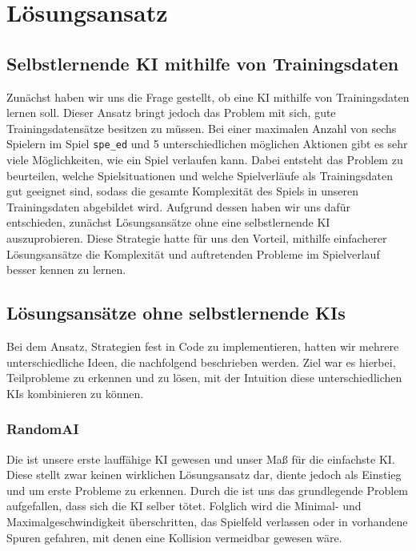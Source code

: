 \chapter{Lösungsansatz}
\label{ch:loesungsansatz}

\section{Selbstlernende KI mithilfe von Trainingsdaten}
\label{sec:selbstlernende-ki-trainingsdaten}

Zunächst haben wir uns die Frage gestellt, ob eine \ac{KI} mithilfe von Trainingsdaten lernen soll.
Dieser Ansatz bringt jedoch das Problem mit sich, gute Trainingsdatensätze besitzen zu müssen.
Bei einer maximalen Anzahl von sechs Spielern im Spiel \texttt{spe\_ed} und 5 unterschiedlichen möglichen Aktionen gibt
es sehr viele Möglichkeiten, wie ein Spiel verlaufen kann.
Dabei entsteht das Problem zu beurteilen, welche Spielsituationen und welche Spielverläufe als Trainingsdaten gut
geeignet sind, sodass die gesamte Komplexität des Spiels in unseren Trainingsdaten abgebildet wird.
Aufgrund dessen haben wir uns dafür entschieden, zunächst Lösungsansätze ohne eine selbstlernende \ac{KI}
auszuprobieren.
Diese Strategie hatte für uns den Vorteil, mithilfe einfacherer Lösungsansätze die Komplexität und auftretenden Probleme
im Spielverlauf besser kennen zu lernen. 

\section{Lösungsansätze ohne selbstlernende KIs}
\label{sec:loesungsansatz-ohne-selbstlernende-kis}

Bei dem Ansatz, Strategien fest in Code zu implementieren, hatten wir mehrere unterschiedliche Ideen,
die nachfolgend beschrieben werden.
Ziel war es hierbei, Teilprobleme zu erkennen und zu lösen, mit der Intuition diese unterschiedlichen \ac{KI}s
kombinieren zu können.

\subsection{RandomAI}
\label{subsec:random-ai}

Die  ist unsere erste lauffähige KI gewesen und unser Maß für die einfachste \ac{KI}.
Diese stellt zwar keinen wirklichen Lösungsansatz dar, diente jedoch als Einstieg und um erste Probleme zu erkennen.
Durch die  ist uns das grundlegende Problem aufgefallen, dass sich die \ac{KI} selber tötet.
Folglich wird die Minimal- und Maximalgeschwindigkeit überschritten, das Spielfeld verlassen oder in vorhandene Spuren
gefahren, mit denen eine Kollision vermeidbar gewesen wäre.

